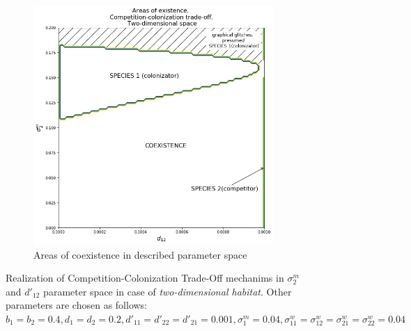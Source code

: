 \documentclass[%
 aip,
rsi,%
 amsmath,amssymb,
 reprint,%
]{revtex4-1}
\begin{document}
\begin{figure}
\begin{subfigure}{.5\textwidth}
  \includegraphics[width=.95\linewidth]{arccto08d2.png}
  \caption{Areas of coexistence in described parameter space}
  \label{fig:cctod2:sub2}
\end{subfigure}
\caption{Realization of Competition-Colonization Trade-Off mechanims in $\sigma^m_2$ and $d'_{12}$ parameter space in case of \emph{two-dimensional habitat}. Other parameters are chosen as follows:  $b_{1}=b_{2}=0.4
		, d_{1}=d_{2}=0.2
		, d'_{11}=d'_{22}=d'_{21}=0.001,
		\sigma_{1}^{m}=0.04
            , \sigma_{11}^{w}=\sigma_{12}^{w}=\sigma_{21}^{w}=\sigma_{22}^{w}=0.04$}
\label{fig:cctod2}
\end{figure}
\end{document}
